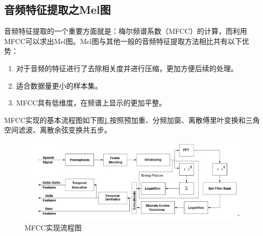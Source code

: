 \subsection{音频特征提取之Mel图}
音频特征提取的一个重要方面就是：梅尔频谱系数（MFCC）的计算，而利用MFCC可以求出Mel图。Mel图与其他一般的音频特征提取方法相比共有以下优势：
\begin{enumerate}
    \item 对于音频的特征进行了去除相关度并进行压缩，更加方便后续的处理。
    \item 适合数据量更小的样本集。
    \item MFCC具有低维度，在频谱上显示的更加平整。
\end{enumerate}
MFCC实现的基本流程图如下图\ref{fig:MFCC},按照预加重、分频加窗、离散傅里叶变换和三角空间滤波、离散余弦变换共五步。
     \begin{figure}[h]
      \centering
      \includegraphics[width=\textwidth]{figures/MFCC.jpg}
      \caption{MFCC实现流程图}
      \label{fig:MFCC}
    \end{figure}

